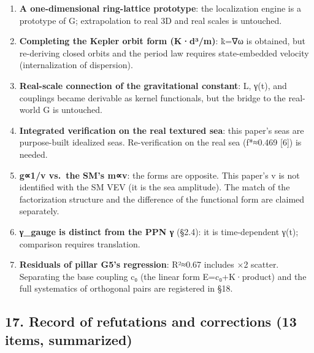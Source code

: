\documentclass[
]{article}
\providecommand{\tightlist}{%
  \setlength{\itemsep}{0pt}\setlength{\parskip}{0pt}}
\begin{document}
\begin{enumerate}
\def\labelenumi{\arabic{enumi}.}
\tightlist
\item
  \textbf{A one-dimensional ring-lattice prototype}: the localization
  engine is a prototype of G; extrapolation to real 3D and real scales
  is untouched.
\item
  \textbf{Completing the Kepler orbit form (K·d³/m)}: k̇=∇ω is obtained,
  but re-deriving closed orbits and the period law requires
  state-embedded velocity (internalization of dispersion).
\item
  \textbf{Real-scale connection of the gravitational constant}: L, γ(t),
  and couplings became derivable as kernel functionals, but the bridge
  to the real-world G is untouched.
\item
  \textbf{Integrated verification on the real textured sea}: this
  paper's seas are purpose-built idealized seas. Re-verification on the
  real sea (f*≈0.469 {[}6{]}) is needed.
\item
  \textbf{g∝1/v vs.~the SM's m∝v}: the forms are opposite. This paper's
  v is not identified with the SM VEV (it is the sea amplitude). The
  match of the factorization structure and the difference of the
  functional form are claimed separately.
\item
  \textbf{γ\_gauge is distinct from the PPN γ} (§2.4): it is
  time-dependent γ(t); comparison requires translation.
\item
  \textbf{Residuals of pillar G5's regression}: R²≈0.67 includes ×2
  scatter. Separating the base coupling c₀ (the linear form
  E=c₀+K·product) and the full systematics of orthogonal pairs are
  registered in §18.
\end{enumerate}

\subsection{17. Record of refutations and corrections (13 items,
summarized)}\label{record-of-refutations-and-corrections-13-items-summarized}
\end{document}
